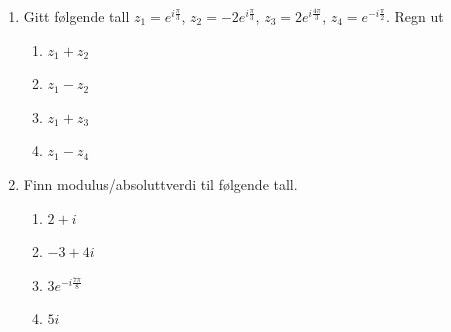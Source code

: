 \documentclass[a4paper,norsk,12pt]{article}
\begin{document}
{\begin{multicols}{2}
\begin{enumerate}
\columnbreak
\item
Gitt følgende tall $z_1 = e^{i\frac{\pi}{3}}$, $z_2 = -2e^{i\frac{\pi}{3}}$, $z_3 = 2e^{i\frac{4\pi}{3}}$, $z_4 = e^{-i\frac{\pi}{2}}$. Regn ut
\begin{enumerate}[label=\alph*)]
\item
$z_1 + z_2$
\item
$z_1 - z_2$
\item
$z_1+z_3$
\item
$z_1-z_4$
\end{enumerate}
\item
Finn modulus/absoluttverdi til følgende tall.
\begin{enumerate}[label=\alph*)]
\item $2 + i$
\item $-3 + 4i$
\item $3e^{-i\frac{7\pi}{8}}$
\item $5i$
\end{enumerate}


\end{enumerate}
\end{multicols}}
\end{document}
